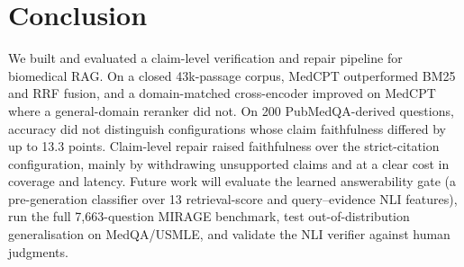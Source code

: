 \documentclass[11pt]{article}
\begin{document}
\section{Conclusion}
We built and evaluated a claim-level verification and repair pipeline for biomedical RAG. On a closed 43k-passage corpus, MedCPT outperformed BM25 and RRF fusion, and a domain-matched cross-encoder improved on MedCPT where a general-domain reranker did not. On 200 PubMedQA-derived questions, accuracy did not distinguish configurations whose claim faithfulness differed by up to 13.3 points. Claim-level repair raised faithfulness over the strict-citation configuration, mainly by withdrawing unsupported claims and at a clear cost in coverage and latency. Future work will evaluate the learned answerability gate (a pre-generation classifier over 13 retrieval-score and query--evidence NLI features), run the full 7,663-question MIRAGE benchmark, test out-of-distribution generalisation on MedQA/USMLE, and validate the NLI verifier against human judgments.
\end{document}
